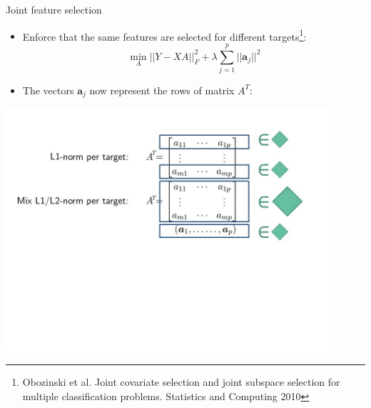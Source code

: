 \documentclass[]{beamer}
\renewcommand{\vec}[1]{\boldsymbol{#1}}
\begin{document}
\begin{frame}{Joint feature selection}
\begin{itemize}
\item Enforce that the same features are selected for different targets\footnote{Obozinski et al. Joint covariate selection and joint subspace selection
for multiple classification problems. Statistics and Computing 2010}:
$$
\min_A ||Y - XA ||^2_F + \lambda \sum_{j=1}^p ||\vec{a}_j||^2  
$$ 
\item The vectors $\vec{a}_j$ now represent the rows of matrix $A^T$:
\end{itemize}
\begin{center}
\includegraphics[width=0.9\textwidth,trim = 0 240 30 50,clip]{Figures/pictures/Dia21}
\end{center}
\end{frame}
\end{document}
